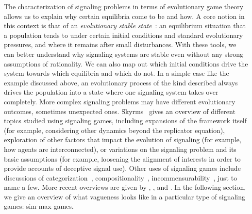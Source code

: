 \documentclass[a4paper]{article}
\begin{document}
The characterization of signaling problems in terms of evolutionary game theory allows us to explain why certain equilibria come to be and how.
A core notion in this context is that of an \emph{evolutionary stable state}~\parencite{maynard_smith_evolution_1982}: an equilibrium situation that a population tends to under certain initial conditions and standard evolutionary pressures, and where it remains after small disturbances.
With these tools, we can better understand why signaling systems are stable even without any strong assumptions of rationality.
We can also map out which initial conditions drive the system towards which equilibria and which do not.
In a simple case like the example discussed above, an evolutionary process of the kind described always drives the population into a state where one signaling system takes over completely. %
More complex signaling problems may have different evolutionary outcomes, sometimes unexpected ones.
Skyrms~\parencite*{skyrms_signals_2010} gives an overview of different topics studied using signaling games, including expansions of the framework itself (for example, considering other dynamics beyond the replicator equation), exploration of other factors that impact the evolution of signaling (for example, how agents are interconnected), or variations on the signaling problem and its basic assumptions (for example, loosening the alignment of interests in order to provide accounts of deceptive signal use).
Other uses of signaling games include discussions of categorization~\parencite[\emph{e.g.}][]{jager_language_2007}, compositionality~\parencite[\emph{e.g.}][]{barrett_evolution_2009}, incommensurability~\parencite[\emph{e.g.}][]{barrett_faithful_2010}, just to name a few.
More recent overviews are given by \textcites{huttegger_how_2014}, \textcite{huttegger_dynamics_2014}, and \citet{FrankeWagner2014:Game-Theory-and}.
In the following section, we give an overview of what vagueness looks like in a particular type of signaling games: sim-max games.

%
\end{document}
